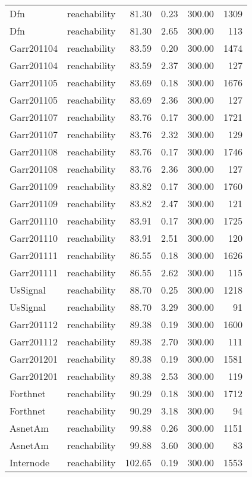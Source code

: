 \begin{tabular}{llrrrr}
Dfn & reachability & 81.30 & 0.23 & 300.00 & 1309 \\
Dfn & reachability & 81.30 & 2.65 & 300.00 & 113 \\
Garr201104 & reachability & 83.59 & 0.20 & 300.00 & 1474 \\
Garr201104 & reachability & 83.59 & 2.37 & 300.00 & 127 \\
Garr201105 & reachability & 83.69 & 0.18 & 300.00 & 1676 \\
Garr201105 & reachability & 83.69 & 2.36 & 300.00 & 127 \\
Garr201107 & reachability & 83.76 & 0.17 & 300.00 & 1721 \\
Garr201107 & reachability & 83.76 & 2.32 & 300.00 & 129 \\
Garr201108 & reachability & 83.76 & 0.17 & 300.00 & 1746 \\
Garr201108 & reachability & 83.76 & 2.36 & 300.00 & 127 \\
Garr201109 & reachability & 83.82 & 0.17 & 300.00 & 1760 \\
Garr201109 & reachability & 83.82 & 2.47 & 300.00 & 121 \\
Garr201110 & reachability & 83.91 & 0.17 & 300.00 & 1725 \\
Garr201110 & reachability & 83.91 & 2.51 & 300.00 & 120 \\
Garr201111 & reachability & 86.55 & 0.18 & 300.00 & 1626 \\
Garr201111 & reachability & 86.55 & 2.62 & 300.00 & 115 \\
UsSignal & reachability & 88.70 & 0.25 & 300.00 & 1218 \\
UsSignal & reachability & 88.70 & 3.29 & 300.00 & 91 \\
Garr201112 & reachability & 89.38 & 0.19 & 300.00 & 1600 \\
Garr201112 & reachability & 89.38 & 2.70 & 300.00 & 111 \\
Garr201201 & reachability & 89.38 & 0.19 & 300.00 & 1581 \\
Garr201201 & reachability & 89.38 & 2.53 & 300.00 & 119 \\
Forthnet & reachability & 90.29 & 0.18 & 300.00 & 1712 \\
Forthnet & reachability & 90.29 & 3.18 & 300.00 & 94 \\
AsnetAm & reachability & 99.88 & 0.26 & 300.00 & 1151 \\
AsnetAm & reachability & 99.88 & 3.60 & 300.00 & 83 \\
Internode & reachability & 102.65 & 0.19 & 300.00 & 1553 \\

\end{tabular}
